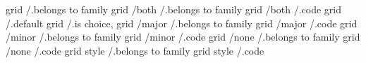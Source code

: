 grid                         /.belongs to family
grid      /both              /.belongs to family
grid      /both              /.code
grid                         /.default          
grid                         /.is choice,       
grid      /major             /.belongs to family
grid      /major             /.code
grid      /minor             /.belongs to family
grid      /minor             /.code
grid      /none              /.belongs to family
grid      /none              /.code
grid style                   /.belongs to family
grid style                   /.code             

